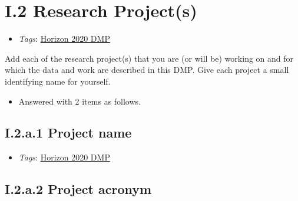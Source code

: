 \documentclass[a4paper,12pt]{report}
\begin{document}
\section*{\protect\textcolor{colorSecId}{I.2} Research Project(s)}

\label{1e85da40-bbfc-4180-903e-6c569ed2da38.c3dabaaf-c946-4a0d-889c-ede966f97667}


\begin{itemize}
  \item \textit{Tags}: \ul{Horizon 2020 DMP}
  \end{itemize}


\noindent
\begin{markdown}
Add each of the research project(s) that you are (or will be) working on and for which the data and work are described in this DMP. Give each project a small identifying name for yourself.
\end{markdown}


\begin{itemize}
  \item[\ArrowBoldDownRight] Answered with 2 items as follows.
\end{itemize}%
\subsection*{\protect\textcolor{colorSecId}{I.2.a.1} Project name}

\label{1e85da40-bbfc-4180-903e-6c569ed2da38.c3dabaaf-c946-4a0d-889c-ede966f97667.01fb6972-a748-47d6-9974-6cfa59b4b156.f0ef08fd-d733-465c-bc66-5de0b826c41b}


\begin{itemize}
  \item \textit{Tags}: \ul{Horizon 2020 DMP}
  \end{itemize}





\subsection*{\protect\textcolor{colorSecId}{I.2.a.2} Project acronym}
\end{document}
